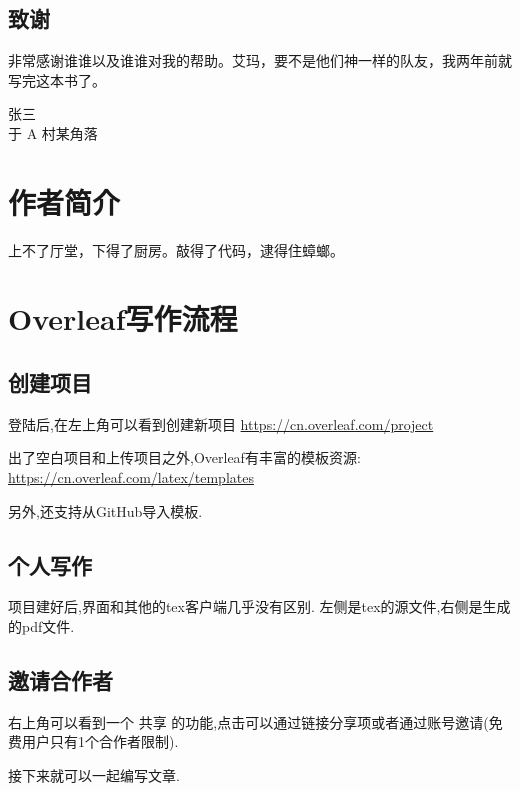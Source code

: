 \documentclass[]{ctexbook}
\let\BeginKnitrBlock\begin \let\EndKnitrBlock\end
\begin{document}
\hypertarget{section-1}{%
\section*{致谢}\label{section-1}}


非常感谢谁谁以及谁谁对我的帮助。艾玛，要不是他们神一样的队友，我两年前就写完这本书了。

\BeginKnitrBlock{flushright}
张三\\
于 A 村某角落
\EndKnitrBlock{flushright}

\hypertarget{author}{%
\chapter*{作者简介}\label{author}}


上不了厅堂，下得了厨房。敲得了代码，逮得住蟑螂。

\mainmatter

\hypertarget{intro}{%
\chapter{Overleaf写作流程}\label{intro}}

\hypertarget{section-2}{%
\section{创建项目}\label{section-2}}

登陆后,在左上角可以看到创建新项目
\url{https://cn.overleaf.com/project}

出了空白项目和上传项目之外,Overleaf有丰富的模板资源:
\url{https://cn.overleaf.com/latex/templates}

另外,还支持从GitHub导入模板.

\hypertarget{section-3}{%
\section{个人写作}\label{section-3}}

项目建好后,界面和其他的tex客户端几乎没有区别.
左侧是tex的源文件,右侧是生成的pdf文件.

\hypertarget{section-4}{%
\section{邀请合作者}\label{section-4}}

右上角可以看到一个 共享 的功能,点击可以通过链接分享项或者通过账号邀请(免费用户只有1个合作者限制).

接下来就可以一起编写文章.
\end{document}
